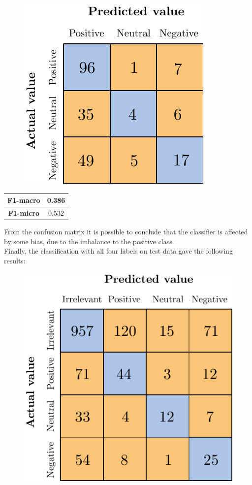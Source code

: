 \begin{figure}[H]
	\centering
	\includegraphics[scale=1]{figures/conf_matrices/ita_brand/ita_snt_brand_bpef_afs.pdf}
	\label{fig:ita_snt_brand_bpef_afs}
\end{figure}

\begin{center}
	\begin{tabular}{ | c | c | } 
		\hline
		\textbf{F1-macro} & 0.386 \\
		\hline
		\textbf{F1-micro} & 0.532 \\ 
		\hline
	\end{tabular}
\end{center}

From the confusion matrix it is possible to conclude that the classifier is affected by some bias, due to the imbalance to the positive class.\\
Finally, the classification with all four labels on test data gave the following results:

\begin{figure}[H]
	\centering
	\includegraphics[scale=1]{figures/conf_matrices/ita_brand/ita_cascade_brand_bpef_tst.pdf}
	\label{fig:ita_cascade_brand_bpef_tst}
\end{figure}

